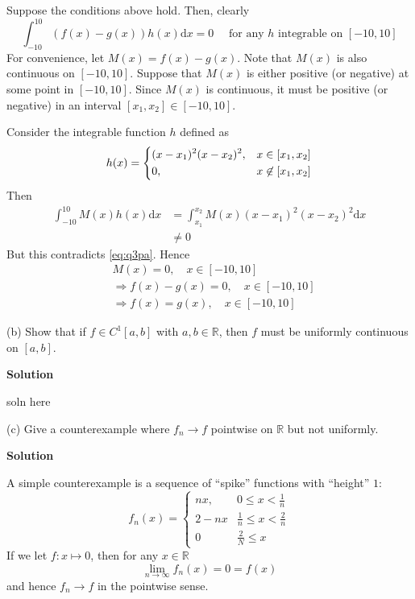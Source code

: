 \documentclass{article}
\begin{document}
Suppose the conditions above hold. Then, clearly
%
\begin{equation}
    \int_{-10}^{10} \left(f(x) - g(x)\right) h(x) \mathrm{d} x = 0
    \quad \text { for any } h \text { integrable on } [-10, 10]
    \label{eq:q3pa}
\end{equation}
%
For convenience, let $M(x) = f(x) - g(x)$. Note that $M(x)$ is also
continuous on $[-10, 10]$. Suppose that $M(x)$ is either positive (or
negative) at some point in $[-10, 10]$. Since $M(x)$ is continuous, it
must be positive (or negative) in an interval $[x_1, x_2] \in [-10, 10]$.

Consider the integrable function $h$ defined as
%
\begin{equation*}
    h(x) =
        \begin{dcases}
            (x - x_1)^2 (x - x_2)^2, & x \in [x_1, x_2] \\
            0, & x \not\in [x_1, x_2]
        \end{dcases}
\end{equation*}
%
Then
%
\begin{align*}
    \int_{-10}^{10} M(x) h(x) \mathrm{d} x
        &= \int_{x_1}^{x_2} M(x) (x - x_1)^2 (x - x_2)^2 \mathrm{d} x \\
        &\neq 0
\end{align*}
%
But this contradicts \eqref{eq:q3pa}. Hence
%
\begin{align*}
    &M(x) = 0, \quad x \in [-10, 10] \\
    &\Rightarrow f(x) - g(x) = 0, \quad x \in [-10, 10] \\
    &\Rightarrow f(x) = g(x), \quad x \in [-10, 10]
\end{align*}

\vspace{5mm}

(b) Show that if $f \in C^{1}[a, b]$ with $a, b \in \mathbb{R}$, then
$f$ must be uniformly continuous on $[a, b]$.

\textbf{Solution}

soln here

\vspace{5mm}

(c) Give a counterexample where $f_n \to f$ pointwise on
$\mathbb{R}$ but not uniformly.

\textbf{Solution}

A simple counterexample is a sequence of ``spike'' functions with
``height'' $1$:
%
\begin{equation*}
    f_n(x) =
        \begin{cases}
            n x, & 0 \leq x < \frac{1}{n} \\
            2 - n x & \frac{1}{n} \leq x < \frac{2}{n} \\
            0 & \frac{2}{N} \leq x
        \end{cases}
\end{equation*}
%
If we let $f: x \mapsto 0$, then for any $x \in \mathbb{R}$
%
\begin{equation*}
    \lim_{n \to \infty} f_n(x) = 0 = f(x)
\end{equation*}
%
and hence $f_n \to f$ in the pointwise sense.
\end{document}
